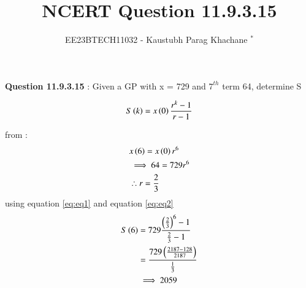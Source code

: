 \documentclass[journal,12pt,twocolumn]{IEEEtran}
\theoremstyle{remark}
\begin{document}

\vspace{3cm}

\Large\title{NCERT Question 11.9.3.15}
\large\author{EE23BTECH11032 - Kaustubh Parag Khachane $^{*}$%
}
\maketitle
\newpage
\bigskip

\renewcommand{\thefigure}{\theenumi}
\renewcommand{\thetable}{\theenumi}
\large\textbf{Question 11.9.3.15} : Given a GP with x = 729 and \(7^{th}\) term 64, determine S

\solution


\begin{align}
	S\left(k\right) = x\left(0\right)\frac{r^k -1}{r-1} \label{eq:eq1}
\end{align}

from  :
\begin{align}
    &x\left(6\right) = x\left(0\right)r^6\\
    &\implies 64 = 729r^6\\
    &\therefore r = \frac{2}{3}\label{eq:eq2}
\end{align}
    using equation \eqref{eq:eq1} and equation \eqref{eq:eq2}
\begin{align}
	S\left(6\right) &= 729\frac{\left(\frac{2}{3}\right)^6 - 1}{\frac{2}{3} - 1}\\
  & = \frac{729\left(\frac{2187 - 128}{2187}\right)}{\frac{1}{3}}\\
  &\implies 2059
\end{align}
\end{document}
